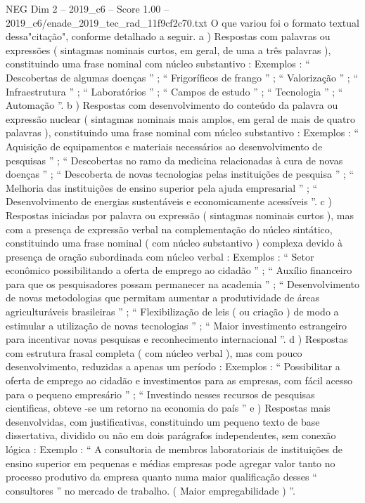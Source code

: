 \begin{textsample}{NEG Dim 2 – 2019\_c6 – Score 1.00 – 2019\_c6/enade\_2019\_tec\_rad\_11f9cf2c70.txt}
O que variou foi o formato textual dessa"citação", conforme detalhado a seguir. a ) Respostas com palavras ou expressões ( sintagmas nominais curtos, em geral, de uma a três palavras ), constituindo uma frase nominal com núcleo substantivo : Exemplos : “ Descobertas de algumas doenças ” ; “ Frigoríficos de frango ” ; “ Valorização ” ; “ Infraestrutura ” ; “ Laboratórios ” ; “ Campos de estudo ” ; “ Tecnologia ” ; “ Automação ”. b ) Respostas com desenvolvimento do conteúdo da palavra ou expressão nuclear ( sintagmas nominais mais amplos, em geral de mais de quatro palavras ), constituindo uma frase nominal com núcleo substantivo : Exemplos : “ Aquisição de equipamentos e materiais necessários ao desenvolvimento de pesquisas ” ; “ Descobertas no ramo da medicina relacionadas à cura de novas doenças ” ; “ Descoberta de novas tecnologias pelas instituições de pesquisa ” ; “ Melhoria das instituições de ensino superior pela ajuda empresarial ” ; “ Desenvolvimento de energias sustentáveis e economicamente acessíveis ”. c ) Respostas iniciadas por palavra ou expressão ( sintagmas nominais curtos ), mas com a presença de expressão verbal na complementação do núcleo sintático, constituindo uma frase nominal ( com núcleo substantivo ) complexa devido à presença de oração subordinada com núcleo verbal : Exemplos : “ Setor econômico possibilitando a oferta de emprego ao cidadão ” ; “ Auxílio financeiro para que os pesquisadores possam permanecer na academia ” ; “ Desenvolvimento de novas metodologias que permitam aumentar a produtividade de áreas agriculturáveis brasileiras ” ; “ Flexibilização de leis ( ou criação ) de modo a estimular a utilização de novas tecnologias ” ; “ Maior investimento estrangeiro para incentivar novas pesquisas e reconhecimento internacional ”. d ) Respostas com estrutura frasal completa ( com núcleo verbal ), mas com pouco desenvolvimento, reduzidas a apenas um período : Exemplos : “ Possibilitar a oferta de emprego ao cidadão e investimentos para as empresas, com fácil acesso para o pequeno empresário ” ; “ Investindo nesses recursos de pesquisas cientificas, obteve -se um retorno na economia do país ” e ) Respostas mais desenvolvidas, com justificativas, constituindo um pequeno texto de base dissertativa, dividido ou não em dois parágrafos independentes, sem conexão lógica : Exemplo : “ A consultoria de membros laboratoriais de instituições de ensino superior em pequenas e médias empresas pode agregar valor tanto no processo produtivo da empresa quanto numa maior qualificação desses “ consultores ” no mercado de trabalho. ( Maior empregabilidade ) ”.

\end{textsample}
